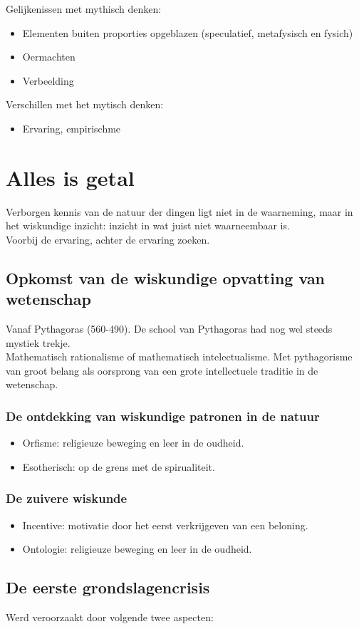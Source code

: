 \documentclass[11pt,a4paper]{article}
\begin{document}
Gelijkenissen met mythisch denken:
\begin{itemize}
\item Elementen buiten proporties opgeblazen (speculatief, metafysisch en fysich)
\item Oermachten
\item Verbeelding
\end{itemize}
Verschillen met het mytisch denken:
\begin{itemize}
\item Ervaring, empirischme
\end{itemize}
\section{Alles is getal}
Verborgen kennis van de natuur der dingen ligt niet in de waarneming, maar in het wiskundige inzicht: inzicht in wat juist niet waarneembaar is.
\\
Voorbij de ervaring, achter de ervaring zoeken.
\subsection{Opkomst van de wiskundige opvatting van wetenschap}
Vanaf Pythagoras (560-490). De school van Pythagoras had nog wel steeds mystiek trekje.
\\
Mathematisch rationalisme of mathematisch intelectualisme. Met pythagorisme van groot belang als oorsprong van een grote intellectuele traditie in de wetenschap.
\subsubsection{De ontdekking van wiskundige patronen in de natuur}
\begin{itemize}
\item Orfisme: religieuze beweging en leer in de oudheid.
\item Esotherisch: op de grens met de spirualiteit.
\end{itemize}
\subsubsection{De zuivere wiskunde}
\begin{itemize}
\item Incentive: motivatie door het eerst verkrijgeven van een beloning.
\item Ontologie: religieuze beweging en leer in de oudheid.
\end{itemize}
\subsection{De eerste grondslagencrisis}
Werd veroorzaakt door volgende twee aspecten:
\end{document}
